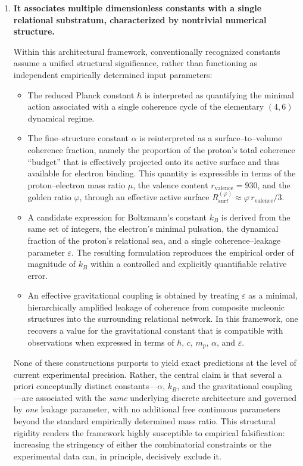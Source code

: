 \documentclass[11pt,a4paper]{article}
\begin{document}
\begin{enumerate}
    \item \textbf{It associates multiple dimensionless constants with a single relational substratum, characterized by nontrivial numerical structure.}

    Within this architectural framework, conventionally recognized constants assume a unified structural significance, rather than functioning as independent empirically determined input parameters:
    \begin{itemize}[label=-]
        \item The reduced Planck constant $\hbar$ is interpreted as quantifying the minimal action associated with a single coherence cycle of the elementary $(4,6)$ dynamical regime.
        \item The fine–structure constant $\alpha$ is reinterpreted as a surface–to–volume coherence fraction, namely the proportion of the proton’s total coherence “budget” that is effectively projected onto its active surface and thus available for electron binding. This quantity is expressible in terms of the proton–electron mass ratio $\mu$, the valence content $r_{\text{valence}} = 930$, and the golden ratio $\varphi$, through an effective active surface $R^{(\varphi)}_{\text{surf}} \approx \varphi\, r_{\text{valence}}/3$.
        \item A candidate expression for Boltzmann’s constant $k_B$ is derived from the same set of integers, the electron’s minimal pulsation, the dynamical fraction of the proton’s relational sea, and a single coherence–leakage parameter $\varepsilon$. The resulting formulation reproduces the empirical order of magnitude of $k_B$ within a controlled and explicitly quantifiable relative error.
        \item An effective gravitational coupling is obtained by treating $\varepsilon$ as a minimal, hierarchically amplified leakage of coherence from composite nucleonic structures into the surrounding relational network. In this framework, one recovers a value for the gravitational constant that is compatible with observations when expressed in terms of $\hbar$, $c$, $m_p$, $\alpha$, and $\varepsilon$.
    \end{itemize}

    None of these constructions purports to yield exact predictions at the level of current experimental precision. Rather, the central claim is that several a priori conceptually distinct constants—$\alpha$, $k_B$, and the gravitational coupling—are associated with the \emph{same} underlying discrete architecture and governed by \emph{one} leakage parameter, with no additional free continuous parameters beyond the standard empirically determined mass ratio. This structural rigidity renders the framework highly susceptible to empirical falsification: increasing the stringency of either the combinatorial constraints or the experimental data can, in principle, decisively exclude it.
\end{enumerate}
\end{document}
